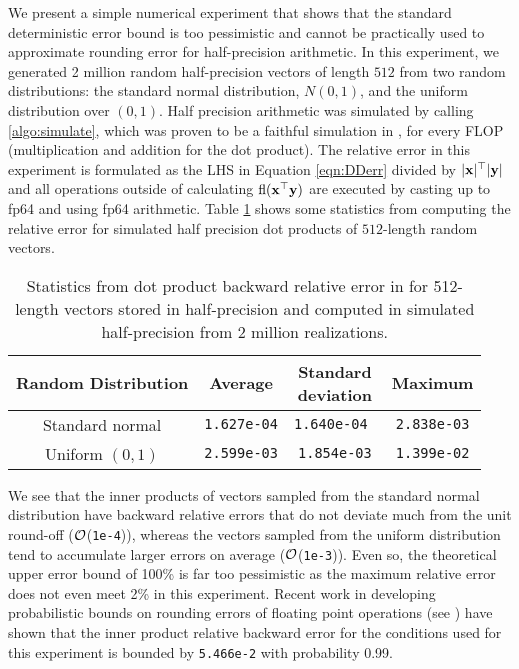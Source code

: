 We present a simple numerical experiment that shows that the standard deterministic error bound is too pessimistic and cannot be practically used to approximate rounding error for half-precision arithmetic. 
In this experiment, we generated 2 million random half-precision vectors of length $512$ from two random distributions: the standard normal distribution, $N(0,1)$, and the uniform distribution over $(0,1)$.
Half precision arithmetic was simulated by calling \cref{algo:simulate}, which was proven to be a faithful simulation in \cite{HighamPranesh2019b}, for every FLOP (multiplication and addition for the dot product).
The relative error in this experiment is formulated as the LHS in Equation \ref{eqn:DDerr} divided by $|\mathbf{x}|^{\top}|\mathbf{y}|$ and all operations outside of calculating $\mathrm{fl}(\mathbf{x}^{\top}\mathbf{y})$ are executed by casting up to fp64 and using fp64 arithmetic.
Table \ref{table:HPdoterr} shows some statistics from computing the relative error for simulated half precision dot products of $512$-length random vectors. 
\begin{table}[h]
	\centering
	\begin{tabular}{||c|c|c|c||} 
		\hline
		Random Distribution & Average & \makecell{Standard\\deviation}& Maximum\\ \hline
		Standard normal &{\tt 1.627e-04} & {\tt 1.640e-04 } & {\tt 2.838e-03}\\ \hline
		Uniform $(0,1)$ & {\tt 2.599e-03}& {\tt 1.854e-03} & {\tt 1.399e-02}\\ \hline
	\end{tabular}
	\caption{Statistics from dot product backward relative error in for 512-length vectors stored in half-precision and computed in simulated half-precision from 2 million realizations.}
	\label{table:HPdoterr}
\end{table}
We see that the inner products of vectors sampled from the standard normal distribution have backward relative errors that do not deviate much from the unit round-off ($\mathcal{O}$({\tt 1e-4})), whereas the vectors sampled from the uniform distribution tend to accumulate larger errors on average ($\mathcal{O}$({\tt 1e-3})). 
Even so, the theoretical upper error bound of 100\% is far too pessimistic as the maximum relative error does not even meet 2\% in this experiment.
Recent work in developing probabilistic bounds on rounding errors of floating point operations (see \cite{Higham2019a,Ipsen2019}) have shown that the inner product relative backward error for the conditions used for this experiment is bounded by {\tt 5.466e-2} with probability 0.99.

